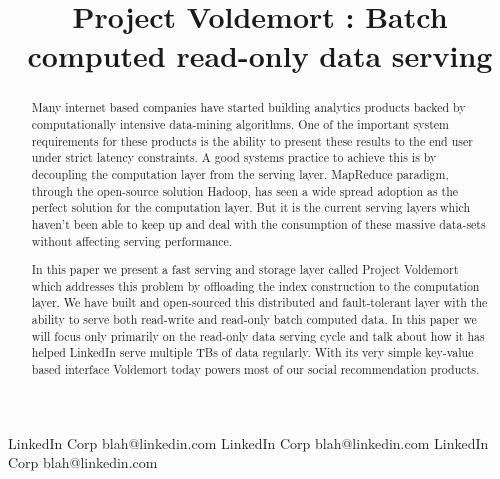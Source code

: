 \documentclass[10pt,twocolumn,preprint,natbib,authoryear]{sigplanconf}
\begin{document}
\copyrightdata{[to be supplied]} 


\title{Project Voldemort : Batch computed read-only data serving}

           {LinkedIn Corp}
           {blah@linkedin.com}
           {LinkedIn Corp}
           {blah@linkedin.com}
           {LinkedIn Corp}
           {blah@linkedin.com}


				
\maketitle

\begin{abstract}
Many internet based companies have started building analytics products backed by computationally intensive data-mining algorithms. One of the important system requirements for these products is the ability to present these results to the end user under strict latency constraints. A good systems practice to achieve this is by decoupling the computation layer from the serving layer. MapReduce paradigm, through the open-source solution Hadoop, has seen a wide spread adoption as the perfect solution for the computation layer. But it is the current serving layers which haven't been able to keep up and deal with the consumption of these massive data-sets without affecting serving performance. 

In this paper we present a fast serving and storage layer called Project Voldemort which addresses this problem by offloading the index construction to the computation layer. We have built and open-sourced this distributed and fault-tolerant layer with the ability to serve both read-write and read-only batch computed data. In this paper we will focus only primarily on the read-only data serving cycle and talk about how it has helped LinkedIn serve multiple TBs of data regularly. With its very simple key-value based interface Voldemort today powers most of our social recommendation products. 
\end{abstract}

\end{document}
